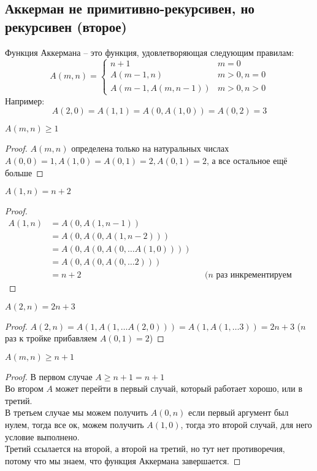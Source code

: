 \subsection{Аккерман не примитивно-рекурсивен, но рекурсивен (второе)}
\label{sec-10-3}
Функция Аккермана -- это функция, удовлетворяющая следующим правилам:
\[
    A(m,n) = \begin{cases}
        n+1 & m = 0\\
        A(m-1,n) & m > 0, n = 0\\
        A(m-1,A(m,n-1)) & m > 0, n > 0
    \end{cases}
\]
Например:
\[A(2, 0) = A(1, 1) = A(0, A(1, 0)) = A(0, 2) = 3\]
\begin{lemma}
$A(m, n) \geq 1$
\end{lemma}
\begin{proof}
$A(m, n)$ определена только на натуральных числах\\
$A(0, 0) = 1, A(1, 0) = A(0, 1) = 2, A(0, 1) = 2$, а все остальное ещё больше
\end{proof}
\begin{lemma}
\label{lemma1a}
$A(1, n) = n + 2$
\end{lemma}
\begin{proof}
\begin{align*}
    A(1, n) &= A(0, A(1, n - 1)) \\
    &= A(0, A(0, A(1, n - 2))) \\
    &= A(0, A(0, A(0, \ldots{} A(1, 0)))) \\
    &= A(0, A(0, A(0, \ldots{} 2))) \\
    &= n + 2 && \text{($n$ раз инкрементируем двойку)}
\end{align*}
\end{proof}
\begin{lemma}
\label{lemma1b}
$A(2, n) = 2n + 3$
\end{lemma}
\begin{proof}
$A(2, n)
= A(1, A(1, \ldots{} A(2, 0)))
= A(1, A(1, \ldots{} 3))
= 2n + 3$ ($n$ раз к тройке прибавляем $A(0, 1) = 2$)
\end{proof}
\begin{lemma}
\label{lemma2}
$A(m, n) \geq n + 1$
\end{lemma}
\begin{proof}
В первом случае $A \geq n + 1 = n + 1$\\
Во втором $A$ может перейти в первый случай, который работает
хорошо, или в третий.\\
В третьем случае мы можем получить $A(0, n)$ если первый аргумент
был нулем, тогда все ок, можем получить $A(1, 0)$, тогда это второй
случай, для него условие выполнено.\\
Третий ссылается на второй, а второй на третий, но тут
нет противоречия, потому что мы знаем, что функция Аккермана
завершается.
\end{proof}
